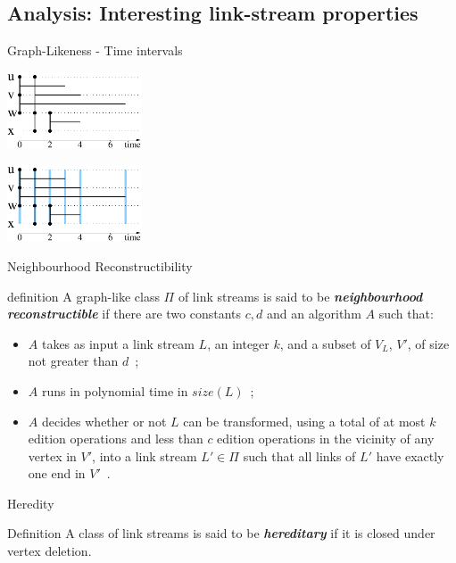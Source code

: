 \documentclass{beamer}
\begin{document}
\subsection{Analysis: Interesting link-stream properties}
\begin{frame}{Graph-Likeness - Time intervals}
  \begin{table}[!h]
    \begin{minipage}{0.4\linewidth}
      \centering
      \includegraphics[width=40mm]{exintervals1.pdf}
    \end{minipage}
    \begin{minipage}{0.4\linewidth}
      \centering
      \includegraphics[width=40mm]{exintervals.pdf}
    \end{minipage}
  \end{table}
\end{frame}
\begin{frame}{Neighbourhood Reconstructibility}
  \begin{block}{definition}
    A graph-like class $\Pi$ of link streams is said to be \emph{\bfseries neighbourhood reconstructible} if there are two constants $c,d$ and an algorithm $A$ such that:
    \begin{itemize}
    \item $A$ takes as input a link stream $L$, an integer $k$, and a subset of $V_L$, $V'$, of size not greater than $d$~;
    \item $A$ runs in polynomial time in $size(L)$~;
    \item $A$ decides whether or not $L$ can be transformed, using a total of at most $k$ edition operations and less than $c$ edition operations in the vicinity of any vertex in $V'$, into a link stream $L'\in \Pi$ such that all links of $L'$ have exactly one end in $V'$~.
    \end{itemize}
  \end{block}
\end{frame}
\begin{frame}{Heredity}
  \begin{block}{Definition}
    A class of link streams is said to be \emph{\bfseries hereditary} if it is closed under vertex deletion.
  \end{block}
\end{frame}
\end{document}
